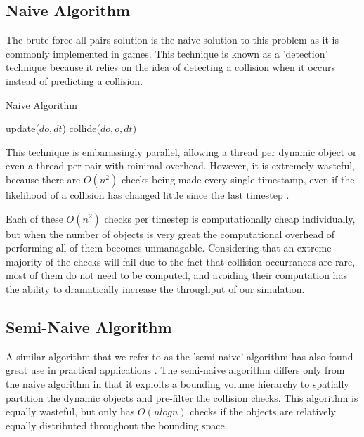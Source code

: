 \documentclass[conference]{IEEEtran}
\begin{document}
\subsection{Naive Algorithm}

The brute force all-pairs solution is the naive solution to this problem as it is commonly implemented in games. This technique is known as a 'detection' technique because it relies on the idea of detecting a collision when it occurs instead of predicting a collision.  

\begin{algorithm}
\caption{Naive Algorithm}
\begin{algorithmic}
		\STATE update($do,dt$)  
				\STATE collide($do, o, dt$)
			\ENDIF
		\ENDFOR
	\ENDFOR
\ENDFOR
\end{algorithmic}
\end{algorithm}

This technique is embarassingly parallel, allowing a thread per dynamic object or even a thread per pair with minimal overhead.  However, it is extremely
wasteful, because there are $O(n^2)$ checks being made every single timestamp, even if the likelihood of a collision has changed little since the last timestep \cite{Seningood}.  

Each of these $O(n^2)$ checks per timestep is computationally cheap individually, but when the number of objects is very great the computational overhead of performing all of them becomes
unmanagable. Considering that an extreme majority of the checks will fail due to the fact that collision occurrances are rare, most of them do not need to be computed, and avoiding their computation has the ability to dramatically increase the 
throughput of our simulation.

\subsection{Semi-Naive Algorithm}

A similar algorithm that we refer to as the 'semi-naive' algorithm has also found great use in practical applications \cite{Bittner02hierarchicaltechniques}.  The semi-naive algorithm differs only from the naive algorithm in that it exploits a bounding volume hierarchy to spatially partition the dynamic objects and pre-filter the collision checks.  This algorithm is equally wasteful, but only has $O(n log n)$ checks if the objects are relatively equally distributed throughout the bounding space.
\end{document}
